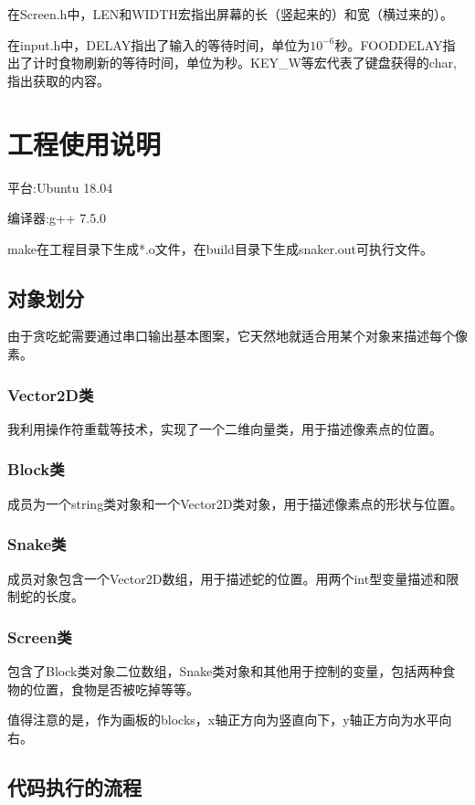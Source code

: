 \documentclass[UTF8]{ctexart}
\begin{document}
    在Screen.h中，LEN和WIDTH宏指出屏幕的长（竖起来的）和宽（横过来的）。

    在input.h中，DELAY指出了输入的等待时间，单位为$10^{-6}$秒。FOODDELAY指出了计时食物刷新的等待时间，单位为秒。KEY\_W等宏代表了键盘获得的char,指出获取的内容。


\section{工程使用说明}
    平台:Ubuntu 18.04
    
    编译器:g++ 7.5.0
    
    make在工程目录下生成*.o文件，在build目录下生成snaker.out可执行文件。
    


\subsection{对象划分}
    由于贪吃蛇需要通过串口输出基本图案，它天然地就适合用某个对象来描述每个像素。
    
\subsubsection{Vector2D类}
    我利用操作符重载等技术，实现了一个二维向量类，用于描述像素点的位置。

\subsubsection{Block类}
    成员为一个string类对象和一个Vector2D类对象，用于描述像素点的形状与位置。

\subsubsection{Snake类}
    成员对象包含一个Vector2D数组，用于描述蛇的位置。用两个int型变量描述和限制蛇的长度。

\subsubsection{Screen类}
    包含了Block类对象二位数组，Snake类对象和其他用于控制的变量，包括两种食物的位置，食物是否被吃掉等等。
    
    值得注意的是，作为画板的blocks，x轴正方向为竖直向下，y轴正方向为水平向右。

\subsection{代码执行的流程}
        
\end{document}
